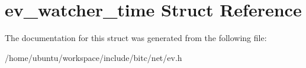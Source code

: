 \hypertarget{structev__watcher__time}{\section{ev\-\_\-watcher\-\_\-time Struct Reference}
\label{structev__watcher__time}
}


The documentation for this struct was generated from the following file\-:\begin{DoxyCompactItemize}
\item 
/home/ubuntu/workspace/include/bitc/net/ev.\-h\end{DoxyCompactItemize}
